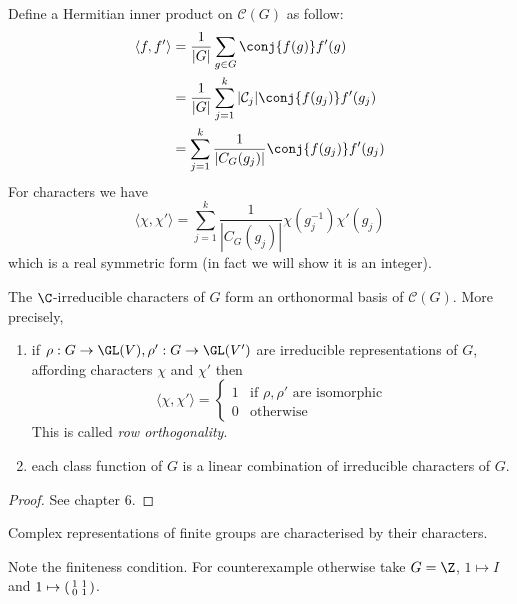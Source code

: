 \documentclass[a4paper]{article}
\begin{document}
Define a Hermitian inner product on \(\mathcal C(G)\) as follow:
\begin{align*}
  \langle f, f' \rangle
  &= \frac{1}{|G|} \sum_{g \in G} \conj{f(g)} f'(g) \\
  &= \frac{1}{|G|} \sum_{j = 1}^k |\mathcal C_j| \conj{f(g_j)} f'(g_j) \\
  &= \sum_{j = 1}^k \frac{1}{|C_G(g_j)|} \conj{f(g_j)} f'(g_j)
\end{align*}
For characters we have
\[
  \langle \chi, \chi' \rangle
  = \sum_{j = 1}^k \frac{1}{|C_G(g_j)|} \chi(g_j^{-1}) \chi'(g_j)
\]
which is a real symmetric form (in fact we will show it is an integer).

\begin{theorem}
  \label{thm:completeness of character}
  The \(\C\)-irreducible characters of \(G\) form an orthonormal basis of \(\mathcal C(G)\). More precisely,
  \begin{enumerate}
  \item if \(\rho: G \to \GL(V), \rho': G \to \GL(V')\) are irreducible representations of \(G\), affording characters \(\chi\) and \(\chi'\) then
    \[
      \langle \chi, \chi' \rangle =
      \begin{cases}
        1 & \text{if \(\rho, \rho'\) are isomorphic} \\
        0 & \text{otherwise}
      \end{cases}
    \]
    This is called \emph{row orthogonality}.
  \item each class function of \(G\) is a linear combination of irreducible characters of \(G\).
  \end{enumerate}
\end{theorem}

\begin{proof}
  See chapter 6.
\end{proof}

\begin{corollary}
  Complex representations of finite groups are characterised by their characters.
\end{corollary}

Note the finiteness condition. For counterexample otherwise take \(G = \Z\), \(1 \mapsto I\) and \(1 \mapsto
\begin{psmallmatrix}
  1 & 1 \\
  0 & 1
\end{psmallmatrix}
\).
\end{document}
